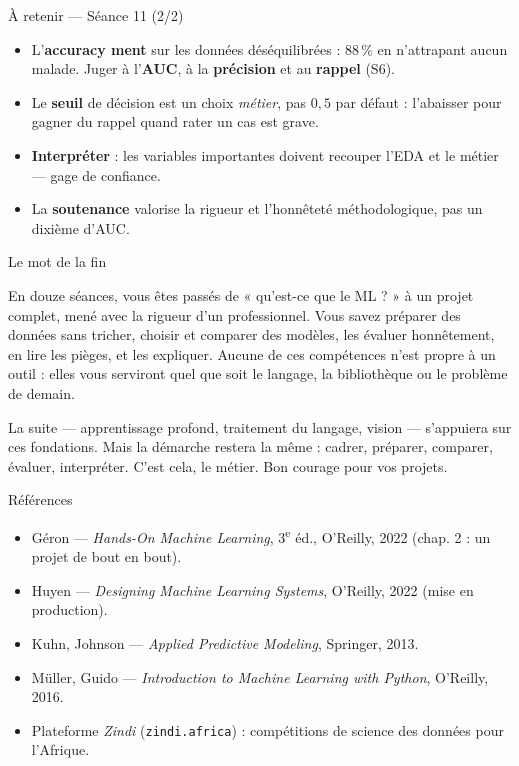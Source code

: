 \documentclass[aspectratio=169,11pt]{beamer}
\begin{document}
\begin{frame}{À retenir — Séance 11 (2/2)}
\begin{ucadret}[Le jugement]
\begin{itemize}\small
  \item L'\textbf{accuracy ment} sur les données déséquilibrées : $88\,\%$ en n'attrapant aucun malade. Juger à l'\textbf{AUC}, à la \textbf{précision} et au \textbf{rappel} (S6).
  \item Le \textbf{seuil} de décision est un choix \emph{métier}, pas $0{,}5$ par défaut : l'abaisser pour gagner du rappel quand rater un cas est grave.
  \item \textbf{Interpréter} : les variables importantes doivent recouper l'EDA et le métier — gage de confiance.
  \item La \textbf{soutenance} valorise la rigueur et l'honnêteté méthodologique, pas un dixième d'AUC.
\end{itemize}
\end{ucadret}
\end{frame}

\begin{frame}{Le mot de la fin}
\begin{ucadfront}
{\small En douze séances, vous êtes passés de « qu'est-ce que le ML ? » à un projet complet, mené avec la rigueur d'un professionnel. Vous savez préparer des données sans tricher, choisir et comparer des modèles, les évaluer honnêtement, en lire les pièges, et les expliquer. Aucune de ces compétences n'est propre à un outil : elles vous serviront quel que soit le langage, la bibliothèque ou le problème de demain.}
\end{ucadfront}
{\small La suite — apprentissage profond, traitement du langage, vision — s'appuiera sur ces fondations. Mais la démarche restera la même : cadrer, préparer, comparer, évaluer, interpréter. C'est cela, le métier. Bon courage pour vos projets.}
\end{frame}

\begin{frame}{Références}
\begin{itemize}\small
  \item Géron — \emph{Hands-On Machine Learning}, 3\textsuperscript{e} éd., O'Reilly, 2022 (chap. 2 : un projet de bout en bout).
  \item Huyen — \emph{Designing Machine Learning Systems}, O'Reilly, 2022 (mise en production).
  \item Kuhn, Johnson — \emph{Applied Predictive Modeling}, Springer, 2013.
  \item Müller, Guido — \emph{Introduction to Machine Learning with Python}, O'Reilly, 2016.
  \item Plateforme \emph{Zindi} (\texttt{zindi.africa}) : compétitions de science des données pour l'Afrique.
\end{itemize}
\end{frame}
\end{document}
